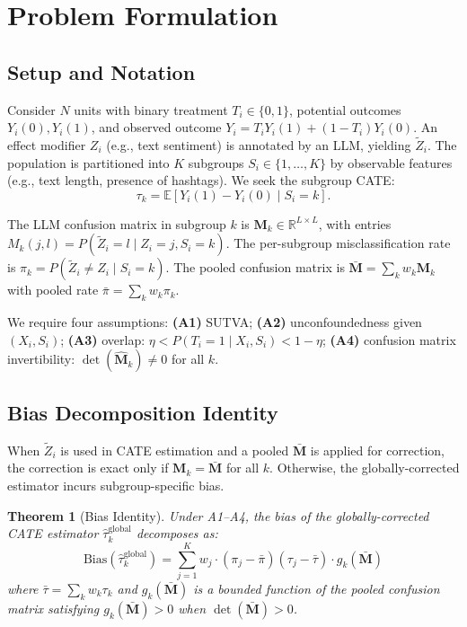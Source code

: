 \documentclass[11pt,twocolumn]{article}
\newtheorem{theorem}{Theorem}
\theoremstyle{remark}
\newcommand{\E}{\mathbb{E}}
\newcommand{\R}{\mathbb{R}}
\newcommand{\Bias}{\mathrm{Bias}}
\newcommand{\vect}[1]{\boldsymbol{#1}}
\begin{document}
\section{Problem Formulation}\label{sec:theory}

\subsection{Setup and Notation}

Consider $N$ units with binary treatment $T_i \in \{0,1\}$, potential outcomes $Y_i(0), Y_i(1)$, and observed outcome $Y_i = T_i Y_i(1) + (1-T_i)Y_i(0)$.
An effect modifier $Z_i$ (e.g., text sentiment) is annotated by an LLM, yielding $\tilde{Z}_i$.
The population is partitioned into $K$ subgroups $S_i \in \{1,\ldots,K\}$ by observable features (e.g., text length, presence of hashtags).
We seek the subgroup CATE:
\begin{equation}
\tau_k = \E[Y_i(1) - Y_i(0) \mid S_i = k].
\end{equation}

The LLM confusion matrix in subgroup $k$ is $\vect{M}_k \in \R^{L \times L}$, with entries $M_k(j,l) = P(\tilde{Z}_i = l \mid Z_i = j, S_i = k)$.
The per-subgroup misclassification rate is $\pi_k = P(\tilde{Z}_i \neq Z_i \mid S_i = k)$.
The pooled confusion matrix is $\bar{\vect{M}} = \sum_k w_k \vect{M}_k$ with pooled rate $\bar{\pi} = \sum_k w_k \pi_k$.

We require four assumptions:
\textbf{(A1)} SUTVA;
\textbf{(A2)} unconfoundedness given $(X_i, S_i)$;
\textbf{(A3)} overlap: $\eta < P(T_i{=}1 \mid X_i, S_i) < 1{-}\eta$;
\textbf{(A4)} confusion matrix invertibility: $\det(\hat{\vect{M}}_k) \neq 0$ for all $k$.

\subsection{Bias Decomposition Identity}

When $\tilde{Z}_i$ is used in CATE estimation and a pooled $\bar{\vect{M}}$ is applied for correction, the correction is exact only if $\vect{M}_k = \bar{\vect{M}}$ for all $k$.
Otherwise, the globally-corrected estimator incurs subgroup-specific bias.

\begin{theorem}[Bias Identity]\label{thm:bias}
Under A1--A4, the bias of the globally-corrected CATE estimator $\hat{\tau}_k^{\mathrm{global}}$ decomposes as:
\begin{equation}\label{eq:bias_identity}
\Bias(\hat{\tau}_k^{\mathrm{global}}) = \sum_{j=1}^{K} w_j \cdot (\pi_j - \bar{\pi})(\tau_j - \bar{\tau}) \cdot g_k(\bar{\vect{M}})
\end{equation}
where $\bar{\tau} = \sum_k w_k \tau_k$ and $g_k(\bar{\vect{M}})$ is a bounded function of the pooled confusion matrix satisfying $g_k(\bar{\vect{M}}) > 0$ when $\det(\bar{\vect{M}}) > 0$.
\end{theorem}
\end{document}

